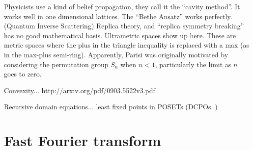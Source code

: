 \documentclass[11pt]{article}
\begin{document}
Physicists use a kind of belief propagation, they call it the ``cavity method''. 
It works well in one dimensional lattices. The ``Bethe Ansatz'' works perfectly.
(Quantum Inverse Scattering)
Replica theory, and ``replica symmetry breaking'' has no good mathematical basis.
Ultrametric spaces show up here. These are metric spaces where
the plus in the triangle inequality is replaced with a max (as in the max-plus semi-ring).
Apparently, Parisi was originally motivated by considering
the permutation group $S_n$ when $n<1$, particularly the limit as $n$ goes to zero.

Convexity...
http://arxiv.org/pdf/0903.5522v3.pdf

Recursive domain equations... least fixed points in POSETs (DCPOs..)



%
%

\section{Fast Fourier transform}

\end{document}
